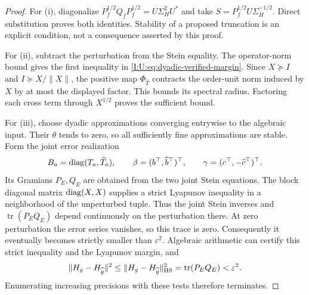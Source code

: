 \begin{proof}
For (i), diagonalize
$P_f^{1/2}Q_fP_f^{1/2}=U\Sigma_H^2U^*$ and take
$S=P_f^{1/2}U\Sigma_H^{-1/2}$. Direct substitution proves both
identities. Stability of a proposed truncation is an explicit condition,
not a consequence asserted by this proof.

For (ii), subtract the perturbation from the Stein equality. The
operator-norm bound gives the first inequality in
\eqref{I:U:eq:dyadic-verified-margin}. Since $X\succeq I$ and
$I\succeq X/\|X\|$, the positive map $\Phi_{\widehat T}$ contracts
the order-unit norm induced by $X$ by at most the displayed factor.
This bounds its spectral radius. Factoring each cross term through
$X^{1/2}$ proves the sufficient bound.

For (iii), choose dyadic approximations converging entrywise to the
algebraic input. Their $\theta$ tends to zero, so all sufficiently fine
approximations are stable. Form the joint error realization
\[
 B_a=\operatorname{diag}(T_a,\widehat T_a),\qquad
 \beta=(b^\top,\widehat b^\top)^\top,\qquad
 \gamma=(c^\top,-\widehat c^\top)^\top.
\]
Its Gramians $P_E,Q_E$ are obtained from the two joint Stein equations.
The block diagonal matrix $\operatorname{diag}(X,X)$ supplies a strict Lyapunov
inequality in a neighborhood of the unperturbed tuple. Thus the joint
Stein inverses and $\operatorname{tr}(P_EQ_E)$ depend continuously on
the perturbation there. At zero perturbation the error series vanishes,
so this trace is zero. Consequently it eventually becomes strictly
smaller than $\varepsilon^2$. Algebraic arithmetic can certify this
strict inequality and the Lyapunov margin, and
\[
 \|H_g-H_{\widehat g}\|^2
 \le\|H_g-H_{\widehat g}\|_{\rm HS}^2
 =\operatorname{tr}(P_EQ_E)<\varepsilon^2.
\]
Enumerating increasing precisions with these tests therefore terminates.
\end{proof}
